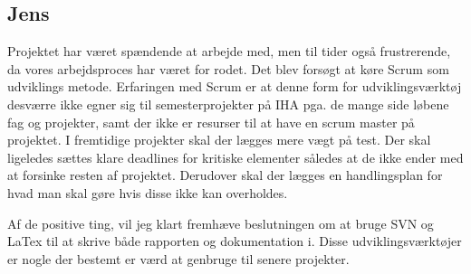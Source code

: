 \subsection{Jens}
Projektet har været spændende at arbejde med, men til tider også frustrerende, da vores arbejdsproces har været for rodet. Det blev forsøgt at køre Scrum som udviklings metode. Erfaringen med Scrum er at denne form for udviklingsværktøj desværre ikke egner sig til semesterprojekter på IHA pga. de mange side løbene fag og projekter, samt der ikke er resurser til at have en scrum master på projektet.
I fremtidige projekter skal der lægges mere vægt på test. Der skal ligeledes sættes klare deadlines for kritiske elementer således at de ikke ender med at forsinke resten af projektet. Derudover skal der lægges en handlingsplan for hvad man skal gøre hvis disse ikke kan overholdes.

Af de positive ting, vil jeg klart fremhæve beslutningen om at bruge SVN og LaTex til at skrive både rapporten og dokumentation i. Disse udviklingsværktøjer er nogle der bestemt er værd at genbruge til senere projekter.     
